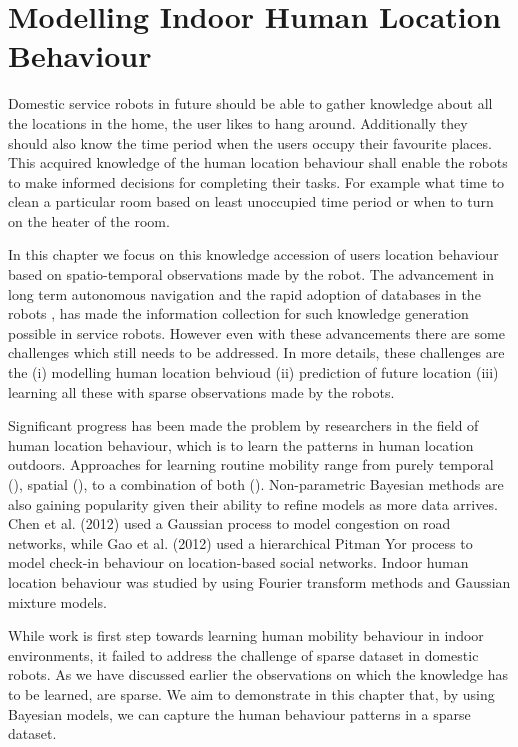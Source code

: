 

\chapter{Modelling Indoor Human Location Behaviour }
\label{chapter:Human location}
Domestic service robots in future should be able to gather knowledge about all the locations in the home, the user likes to hang around. Additionally they should also know the time period when the users occupy their favourite places. This acquired knowledge of the human location behaviour shall enable the robots to make informed decisions for completing their tasks. For example what time to clean a particular room based  on least unoccupied time period or when to turn on the heater of the room. 

In this chapter we focus on this knowledge accession of users location behaviour based on spatio-temporal observations made by the robot. The advancement in long term autonomous navigation \cite{krajnik_life-long_2015} and the rapid adoption of databases in the robots \cite{niemueller2012generic}, has made the information collection for such knowledge generation possible in service robots. However even with these advancements there are some challenges which still needs to be addressed.  In more details, these challenges are the (i) modelling human location behvioud (ii) prediction of future location (iii) learning all these with sparse observations made by the robots. 

Significant progress has been made the problem by researchers in the field of human location behaviour, which is to learn the patterns in human location outdoors. Approaches for learning routine mobility  range from purely temporal (\cite{mcinerney2013modelling, scellato2011nextplace}), spatial (\cite{gao2012exploring,song2006evaluating}), to a combination  of  both  (\cite{eagle2009eigenbehaviors}). Non-parametric Bayesian methods are also gaining popularity given their ability to refine models as more data arrives. Chen et al. (2012) used a Gaussian process to model congestion on road networks, while Gao et al. (2012) used a hierarchical Pitman Yor process to model check-in behaviour on location-based social networks. Indoor human location behaviour was studied by \cite{krajnik_wheres_2015} using Fourier transform methods and Gaussian mixture models. 

While \cite{krajnik_wheres_2015}  work is first step towards learning human mobility behaviour in indoor environments, it failed to address the challenge of sparse dataset in domestic robots. As we have discussed earlier the observations on which the knowledge has to be learned, are sparse. We aim to demonstrate in this chapter that, by using Bayesian models, we can capture the human behaviour patterns in a sparse dataset.


